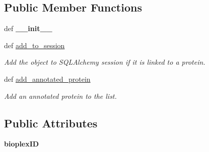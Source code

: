\subsection*{Public Member Functions}
\begin{DoxyCompactItemize}
\item 
\hypertarget{classsrc_1_1fr_1_1tagc_1_1rainet_1_1core_1_1data_1_1BioplexCluster_1_1BioplexCluster_a8174745122e8e54cedb0a0e5673426ad}{def {\bfseries \-\_\-\-\_\-init\-\_\-\-\_\-}}\label{classsrc_1_1fr_1_1tagc_1_1rainet_1_1core_1_1data_1_1BioplexCluster_1_1BioplexCluster_a8174745122e8e54cedb0a0e5673426ad}

\item 
\hypertarget{classsrc_1_1fr_1_1tagc_1_1rainet_1_1core_1_1data_1_1BioplexCluster_1_1BioplexCluster_aea5b415552809c0d6577ac4e80c0f533}{def \hyperlink{classsrc_1_1fr_1_1tagc_1_1rainet_1_1core_1_1data_1_1BioplexCluster_1_1BioplexCluster_aea5b415552809c0d6577ac4e80c0f533}{add\-\_\-to\-\_\-session}}\label{classsrc_1_1fr_1_1tagc_1_1rainet_1_1core_1_1data_1_1BioplexCluster_1_1BioplexCluster_aea5b415552809c0d6577ac4e80c0f533}

\begin{DoxyCompactList}\small\item\em Add the object to S\-Q\-L\-Alchemy session if it is linked to a protein. \end{DoxyCompactList}\item 
\hypertarget{classsrc_1_1fr_1_1tagc_1_1rainet_1_1core_1_1data_1_1BioplexCluster_1_1BioplexCluster_ac5b31e28e2336efb9a0c86a8c07b8cde}{def \hyperlink{classsrc_1_1fr_1_1tagc_1_1rainet_1_1core_1_1data_1_1BioplexCluster_1_1BioplexCluster_ac5b31e28e2336efb9a0c86a8c07b8cde}{add\-\_\-annotated\-\_\-protein}}\label{classsrc_1_1fr_1_1tagc_1_1rainet_1_1core_1_1data_1_1BioplexCluster_1_1BioplexCluster_ac5b31e28e2336efb9a0c86a8c07b8cde}

\begin{DoxyCompactList}\small\item\em Add an annotated protein to the list. \end{DoxyCompactList}\end{DoxyCompactItemize}
\subsection*{Public Attributes}
\begin{DoxyCompactItemize}
\item 
\hypertarget{classsrc_1_1fr_1_1tagc_1_1rainet_1_1core_1_1data_1_1BioplexCluster_1_1BioplexCluster_a9689dcaa3737024caa83f83a5f542948}{{\bfseries bioplex\-I\-D}}\label{classsrc_1_1fr_1_1tagc_1_1rainet_1_1core_1_1data_1_1BioplexCluster_1_1BioplexCluster_a9689dcaa3737024caa83f83a5f542948}

\end{DoxyCompactItemize}
